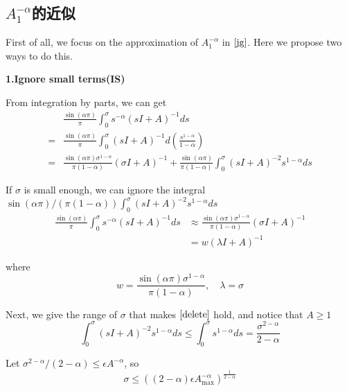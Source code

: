 \subsection{$A_1^{-\alpha}$的近似}


First of all, we focus on the approximation of $A_1^{-\alpha}$ in $\eqref{jg}$. Here we propose two ways to do this.

\textbf{1.Ignore small terms(IS)}

From integration by parts, we can get
\begin{equation}  \begin{aligned} &\frac{\sin(\alpha \pi)}{\pi}\int_0^{\sigma}s^{-\alpha}(s{I}+{A})^{-1}ds\\ =&\frac{\sin(\alpha \pi)}{\pi}\int_{0}^{\sigma}(s{I}+{A})^{-1}d\left(\frac{s^{1-\alpha}}{1-\alpha}\right)\\ =&\frac{\sin(\alpha \pi) \sigma^{1-\alpha}}{\pi(1-\alpha)}(\sigma{I}+{A})^{-1}+\frac{\sin(\alpha \pi)}{\pi(1-\alpha)}\int_0^{\sigma}(s{I}+{A})^{-2}s^{1-\alpha}ds  \end{aligned}\end{equation}

 If $\sigma$ is small enough,  we can ignore the integral $\sin(\alpha \pi)/(\pi(1-\alpha))\int_0^{\sigma}(s{I}+{A})^{-2}s^{1-\alpha}ds$
\begin{equation}
\begin{aligned}
\frac{\sin(\alpha \pi)}{\pi}\int_0^{\sigma}s^{-\alpha}(s{I}+{A})^{-1}ds & \approx \frac{\sin(\alpha \pi) \sigma^{1-\alpha}}{\pi(1-\alpha)}(\sigma{I}+{A})^{-1} \\
&=w(\lambda I+A)^{-1}
\end{aligned}
\label{delete}\end{equation}

where
\begin{equation}
w=\frac{\sin(\alpha \pi)\sigma^{1-\alpha}}{\pi (1-\alpha)},\quad \lambda=\sigma
\end{equation}

Next, we give the range of $\sigma$ that makes $\eqref{delete}$ hold, and notice that $A \ge 1 $
\begin{equation}
\int_0^{\sigma}(s{I}+{A})^{-2}s^{1-\alpha}ds\le \int_0^{\sigma}s^{1-\alpha}ds=\frac{\sigma^{2-\alpha}}{2-\alpha}
\end{equation}


Let $\sigma^{2-\alpha}/(2-\alpha)\le \epsilon A^{-\alpha}$, so
\begin{equation}
\sigma \le \left((2-\alpha)\epsilon A^{-\alpha}_{\max}\right)^{\frac{1}{2-\alpha}}
\end{equation}

